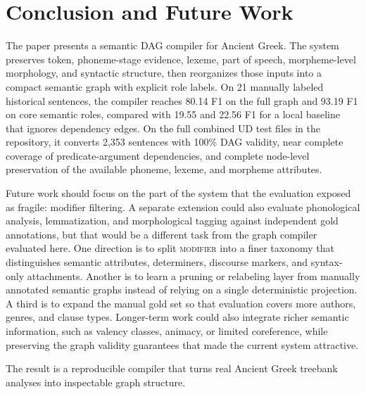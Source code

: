 \documentclass[11pt]{article}
\begin{document}
\section{Conclusion and Future Work}
The paper presents a semantic DAG compiler for Ancient Greek. The system preserves token,
phoneme-stage evidence, lexeme, part of speech, morpheme-level morphology, and syntactic structure, then
reorganizes those inputs into a compact semantic graph with explicit role labels.
On 21 manually labeled historical sentences, the compiler reaches 80.14 F1 on
the full graph and 93.19 F1 on core semantic roles, compared with 19.55 and 22.56
F1 for a local baseline that ignores dependency edges. On the full combined UD
test files in the repository, it converts 2,353 sentences with 100\% DAG validity,
near complete coverage of predicate-argument dependencies, and complete
node-level preservation of the available phoneme, lexeme, and morpheme
attributes.

Future work should focus on the part of the system that the evaluation exposed as
fragile: modifier filtering. A separate extension could also evaluate
phonological analysis, lemmatization, and morphological tagging against independent gold annotations,
but that would be a different task from the graph compiler evaluated here. One direction is to split \textsc{modifier} into a
finer taxonomy that distinguishes semantic attributes, determiners, discourse
markers, and syntax-only attachments. Another is to learn a pruning or
relabeling layer from manually annotated semantic graphs instead of relying on a
single deterministic projection. A third is to expand the manual gold set so
that evaluation covers more authors, genres, and clause types. Longer-term work
could also integrate richer semantic information, such as valency classes,
animacy, or limited coreference, while preserving the graph validity guarantees
that made the current system attractive.

The result is a reproducible compiler that turns real Ancient Greek treebank
analyses into inspectable graph structure.



\end{document}
